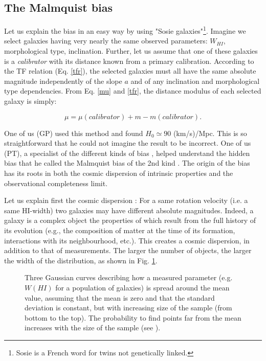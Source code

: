 \subsection{The Malmquist bias}
\label{sec2.2}

Let us explain the bias in an easy way by using "Sosie galaxies"\footnote{ Sosie is a French word for twins not genetically linked.}. 
Imagine we select galaxies having very nearly the same observed parameters: $W_{HI}$, morphological type, inclination. Further, let us assume that one of these galaxies is a {\it{calibrator}} with its distance known from a primary calibration. 
According to the TF relation (Eq. \ref{tfr}), the selected galaxies must all have the same absolute magnitude independently of the slope $a$ and of any inclination and morphological type dependencies. 
From Eq. \ref{mu} and \ref{tfr}, the distance modulus of each selected galaxy is simply:

\begin{equation}
\mu = \mu(calibrator) + m - m(calibrator).
\label{mu2}
\end{equation}  

One of us (GP) used this method and found  $H_0  \simeq 90$ (km/s)/Mpc. This is so straightforward that he could not imagine the result to be incorrect.  One of us (PT), a specialist of the different kinds of bias \cite{bias}, helped understand the hidden bias that he called the Malmquist bias of the 2nd kind \cite{2kind}. The origin of the bias has its roots in both the cosmic dispersion of intrinsic properties and the observational completeness limit. 

Let us explain first the cosmic dispersion :  For a same rotation velocity (i.e. a same HI-width) two galaxies may have different absolute magnitudes. Indeed, a galaxy is a complex object the properties of which result from the full history of its evolution (e.g., the composition of matter at the time of its formation, interactions with its neighbourhood, etc.). This creates a cosmic dispersion, in addition to that of measurements. The larger the number of objects, the larger the width of the distribution, as shown in Fig. \ref{gauss}.

\begin{figure}
\caption{ Three Gaussian curves describing how a measured parameter (e.g. $W(HI)$ for a population of galaxies) is spread around the mean value, assuming that the mean is zero and that the standard deviation is constant, but with increasing size of the sample (from bottom to the top). The probability to find points far from the mean increases with the size of the sample (see  \cite{jnt}).}
\label{gauss}    
\end{figure}

